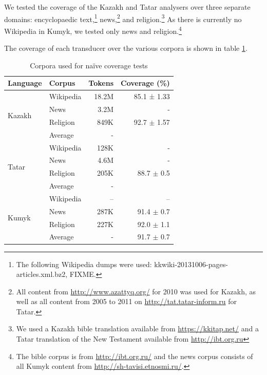 \documentclass[a4paper,11pt,twocolumn]{article}
\begin{document}
We tested the coverage of the Kazakh and Tatar analysers over three separate domains: encyclopaedic text,\footnote{The following Wikipedia dumps were used: kkwiki-20131006-pages-articles.xml.bz2, FIXME.} news,\footnote{All content from \url{http://www.azattyq.org/} for 2010 was used for Kazakh, as well as all content from 2005 to 2011 on \url{http://tat.tatar-inform.ru} for Tatar.} and religion.\footnote{We used a Kazakh bible translation available from \url{https://kkitap.net/} and a Tatar translation of the New Testament available from \url{http://ibt.org.ru}}  As there is currently no Wikipedia in Kumyk, we tested only news and religion.\footnote{The bible corpus is from \url{http://ibt.org.ru/} and the news corpus consists of all Kumyk content from \url{http://sh-tavisi.etnosmi.ru/}.}




The coverage of each transducer over the various corpora is shown in table \ref{table:corpora}.

\begin{table}
\begin{center}
\begin{tabular}{llrr}
\toprule
\textbf{Language} & \textbf{Corpus} & \textbf{Tokens} & \textbf{Coverage} (\%) \\
\midrule
\multirow{4}{*}{Kazakh} & Wikipedia & 18.2M &  85.1 ± 1.33 \\
	& News & 3.2M & - \\
	& Religion & 849K & 92.7 $\pm$ 1.57 \\\cline{2-4}
	& Average & - &  \\
\midrule
\multirow{4}{*}{Tatar} & Wikipedia & 128K &  - \\
	& News & 4.6M & - \\
	& Religion & 205K & 88.7 $\pm$ 0.5 \\\cline{2-4}
	& Average & - &  \\
\midrule
\multirow{4}{*}{Kumyk} & Wikipedia & -- & -- \\
        & News & 287K &  91.4 $\pm$ 0.7 \\
	& Religion & 227K & 92.0 $\pm$ 1.1 \\\cline{2-4}
	& Average & - & 91.7 $\pm$ 0.7 \\
\bottomrule
\end{tabular}
 \caption{Corpora used for naïve coverage tests}
 \label{table:corpora}
\end{center}
\end{table}
\end{document}
